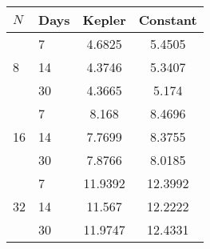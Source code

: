 \begin{tabular}{l|lcc}
\hline
$N$ & Days & Kepler & Constant \\
\hline
\multirow{3}{*}{8} & 7 & 4.6825 & 5.4505 \\ 
                   & 14 & 4.3746 & 5.3407 \\ 
                   &30 & 4.3665 & 5.174 \\ \hline
\multirow{3}{*}{16} & 7 & 8.168 & 8.4696 \\ 
                    &14 & 7.7699 & 8.3755 \\ 
                    &30 & 7.8766 & 8.0185 \\ \hline
\multirow{3}{*}{32} & 7 & 11.9392 & 12.3992 \\ 
&14 & 11.567 & 12.2222 \\ 
&30 & 11.9747 & 12.4331 \\\hline
\end{tabular}